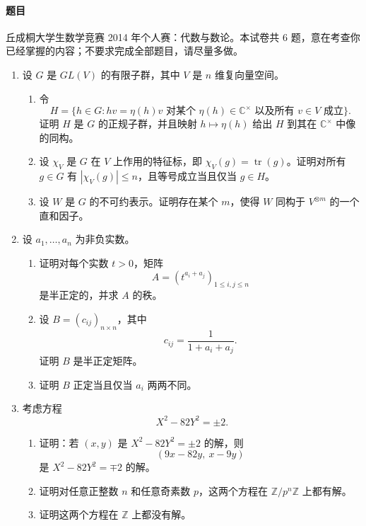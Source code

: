 \documentclass[UTF8,12pt]{ctexart}
\begin{document}
\paragraph{题目}
丘成桐大学生数学竞赛 2014 年个人赛：代数与数论。本试卷共 6 题，意在考查你已经掌握的内容；不要求完成全部题目，请尽量多做。
\begin{enumerate}[label=\textbf{\arabic*.},leftmargin=2.2em]
\item 设 \(G\) 是 \(GL(V)\) 的有限子群，其中 \(V\) 是 \(n\) 维复向量空间。
\begin{enumerate}[label=\textbf{(\alph*)},leftmargin=2.4em]
\item 令
\[
H=\{h\in G: hv=\eta(h)v\text{ 对某个 }\eta(h)\in\mathbb C^\times
\text{ 以及所有 }v\in V\text{ 成立}\}.
\]
证明 \(H\) 是 \(G\) 的正规子群，并且映射 \(h\mapsto\eta(h)\) 给出 \(H\) 到其在 \(\mathbb C^\times\) 中像的同构。
\item 设 \(\chi_V\) 是 \(G\) 在 \(V\) 上作用的特征标，即 \(\chi_V(g)=\operatorname{tr}(g)\)。证明对所有 \(g\in G\) 有 \(|\chi_V(g)|\le n\)，且等号成立当且仅当 \(g\in H\)。
\item 设 \(W\) 是 \(G\) 的不可约表示。证明存在某个 \(m\)，使得 \(W\) 同构于 \(V^{\otimes m}\) 的一个直和因子。
\end{enumerate}

\item 设 \(a_1,\ldots,a_n\) 为非负实数。
\begin{enumerate}[label=\textbf{(\alph*)},leftmargin=2.4em]
\item 证明对每个实数 \(t>0\)，矩阵
\[
A=(t^{a_i+a_j})_{1\le i,j\le n}
\]
是半正定的，并求 \(A\) 的秩。
\item 设 \(B=(c_{ij})_{n\times n}\)，其中
\[
c_{ij}=\frac1{1+a_i+a_j}.
\]
证明 \(B\) 是半正定矩阵。
\item 证明 \(B\) 正定当且仅当 \(a_i\) 两两不同。
\end{enumerate}

\item 考虑方程
\[
X^2-82Y^2=\pm2.
\]
\begin{enumerate}[label=\textbf{(\alph*)},leftmargin=2.4em]
\item 证明：若 \((x,y)\) 是 \(X^2-82Y^2=\pm2\) 的解，则
\[
(9x-82y,\ x-9y)
\]
是 \(X^2-82Y^2=\mp2\) 的解。
\item 证明对任意正整数 \(n\) 和任意奇素数 \(p\)，这两个方程在 \(\mathbb Z/p^n\mathbb Z\) 上都有解。
\item 证明这两个方程在 \(\mathbb Z\) 上都没有解。
\end{enumerate}


\end{enumerate}
\end{document}

